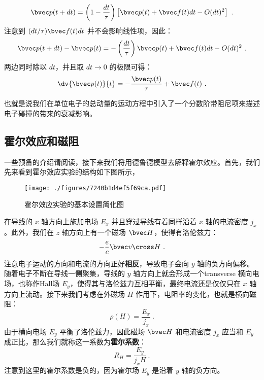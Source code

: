 \begin{equation}
\bvec p(t+dt)=\left(1-\frac{dt}{\tau}\right)\left[\bvec p(t)+\bvec f(t)dt - O(dt)^2\right]~.
\end{equation}
注意到 $(dt/\tau)\bvec f(t)dt$ 并不会影响线性项，因此：
\begin{equation}
\bvec p(t+dt)-\bvec p(t)=-\left(\frac{dt}{\tau}\right)\bvec p(t)+\bvec f(t)dt - O(dt)^2~.
\end{equation}
两边同时除以 $dt$，并且取 $dt\rightarrow 0$ 的极限可得：
\begin{equation}\label{eq_DrudeM_3}
\dv{\bvec p(t)}{t}= -\frac{\bvec p(t)}{\tau}+\bvec f(t)~.
\end{equation}

也就是说我们在单位电子的总动量的运动方程中引入了一个分数阶带阻尼项来描述电子碰撞的带来的衰减影响。
\subsection{霍尔效应和磁阻}
一些预备的介绍请阅读，接下来我们将用德鲁德模型去解释霍尔效应。首先，我们先来看到霍尔效应实验的结构如下图所示，
\begin{figure}[ht]
\centering
\texttt{[image: ./figures/7240b1d4ef5f69ca.pdf]}
\caption{霍尔效应实验的基本设置简化图} \label{fig_DrudeM_2}
\end{figure}
在导线的 $x$ 轴方向上施加电场 $E_x$ 并且穿过导线有着同样沿着 $x$ 轴的电流密度 $j_x$。此外，我们在 $z$ 轴方向上有一个磁场 $\bvec H$，使得有洛伦兹力：
\begin{equation}
-\frac{e}{c}\bvec v \cross H~.
\end{equation}
注意电子运动的方向和电流的方向正好\textbf{相反}，导致电子会向 $y$ 轴的负方向偏移。随着电子不断在导线一侧聚集，导线的 $y$ 轴方向上就会形成一个transverse 横向电场，也称作Hall场 $E_y$，使得其与洛伦兹力互相平衡，最终电流还是仅仅只在 $x$ 轴方向上流动。接下来我们考虑在外磁场 $H$ 作用下，电阻率的变化，也就是横向磁阻：
\begin{equation}
\rho(H)=\frac{E_x}{j_x}~.
\end{equation}
由于横向电场 $E_y$ 平衡了洛伦兹力，因此磁场 $\bvec H$ 和电流密度 $j_x$ 应当和 $E_y$ 成正比，那么我们就称这一系数为\textbf{霍尔系数}：
\begin{equation}\label{eq_DrudeM_5}
R_H = \frac{E_y}{j_xH}~.
\end{equation}
注意到这里的霍尔系数是负的，因为霍尔场 $E_y$ 是沿着 $y$ 轴的负方向。


